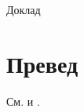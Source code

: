 \documentclass[14pt]{extarticle}
\begin{document}
\thispagestyle{empty}
Доклад

\newpage

\tableofcontents
\newpage

\section{Превед}

См. \cite{berlin2019} и \cite{bi07}.

\printbibliography[heading=bibintoc]%
\nocite{*}
\end{document}
